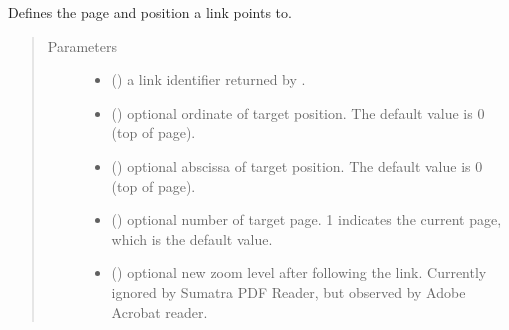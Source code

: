 \documentclass[letterpaper,10pt,english]{sphinxmanual}
\begin{document}
\begin{fulllineitems}
\begin{fulllineitems}
\label{\detokenize{generated/quality_assessment.quality_pdf_report.DefectReportPDF.set_link:quality_assessment.quality_pdf_report.DefectReportPDF.set_link}}
\sphinxAtStartPar
Defines the page and position a link points to.
\begin{quote}\begin{description}
\item[{Parameters}] \leavevmode\begin{itemize}
\item {} 
\sphinxAtStartPar
{} () \textendash{} a link identifier returned by .

\item {} 
\sphinxAtStartPar
{} () \textendash{} optional ordinate of target position.
The default value is 0 (top of page).

\item {} 
\sphinxAtStartPar
{} () \textendash{} optional abscissa of target position.
The default value is 0 (top of page).

\item {} 
\sphinxAtStartPar
{} () \textendash{} optional number of target page.
\sphinxhyphen{}1 indicates the current page, which is the default value.

\item {} 
\sphinxAtStartPar
{} () \textendash{} optional new zoom level after following the link.
Currently ignored by Sumatra PDF Reader, but observed by Adobe Acrobat reader.

\end{itemize}


\end{description}
\end{quote}
\end{fulllineitems}
\end{fulllineitems}
\end{document}

